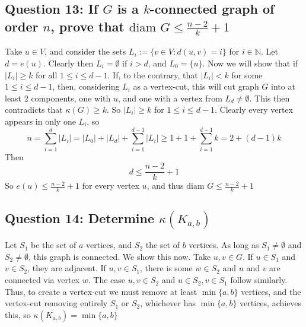 \documentclass[letterpaper, 11pt]{article}
\newcommand{\1}{\mathds{1}}	%
\theoremstyle{definition}
\begin{document}
\subsection*{Question 13: If $G$ is a $k$-connected graph of order $n$, prove that $\text{diam } G \le \frac{n-2}{k} + 1$}
Take $u \in V$, and consider the sets $L_i := \{v \in V: d(u,v) = i\}$ for $i \in \mathbb{N}$. Let $d = e(u)$. Clearly then $L_i = \emptyset$ if $i > d$, and $L_0 = \{u\}$. Now we will show that if $|L_i| \ge k$ for all $1 \le i \le d-1$. If, to the contrary, that $|L_{i}| < k$ for some $1 \le i \le d-1$, then, considering $L_i$ as a vertex-cut, this will cut graph $G$ into at least 2 components, one with $u$, and one with a vertex from $L_d \ne \emptyset$. This then contradicts that $\kappa (G) \ge k$. So $|L_i| \ge k$ for $1 \le i \le d-1$. Clearly every vertex appears in only one $L_i$, so \[
n = \sum \limits _{i=1}^d |L_i| = |L_0| + |L_d| + \sum \limits _{i=1}^{d-1} |L_i| \ge 1 + 1 + \sum \limits _{i=1}^{d-1} k = 2+ (d-1)k
\]
Then \[
d \le \frac{n-2}{k} + 1
\]
So $e(u) \le \frac{n-2}{k} + 1$ for every vertex $u$, and thus $\text{diam }G \le \frac{n-2}{k} + 1$

\subsection*{Question 14: Determine $\kappa (K_{a,b})$}
Let $S_1$ be the set of $a$ vertices, and $S_2$ the set of $b$ vertices. As long as $S_1 \ne \emptyset$ and $S_2 \ne \emptyset$, this graph is connected. We show this now. Take $u,v \in G$. If $u \in S_1$ and $v \in S_2$, they are adjacent. If $u,v \in S_1$, there is some $w \in S_2$ and $u$ and $v$ are connected via vertex $w$. The case $u,v \in S_2$ and $u \in S_2, v \in S_1$ follow similarly. Thus, to create a vertex-cut we must remove at least $\min \{a,b\}$ vertices, and the vertex-cut removing entirely $S_1$ or $S_2$, whichever has $\min \{a,b\}$ vertices, achieves this, so $\kappa (K_{a,b}) = \min \{a,b\}$
\end{document}
